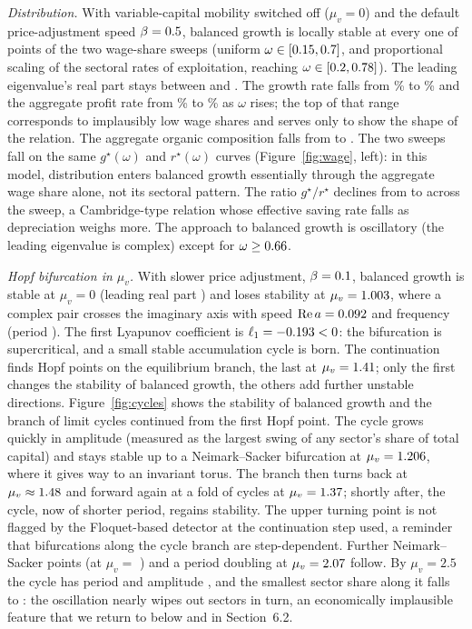 \documentclass[11pt]{article}
\begin{document}
\emph{Distribution.} With variable-capital mobility switched off
($\mu_v=0$) and the default price-adjustment speed $\beta=0.5$,
balanced growth is locally stable at every one of \AccWageNPoints{}
points of the two wage-share sweeps (uniform $\omega\in[0.15,0.7]$, and
proportional scaling of the sectoral rates of exploitation, reaching
$\omega\in[0.2,0.78]$). The leading eigenvalue's real part stays between
\AccWageReMin{} and \AccWageReMax. The growth rate falls from
\AccWageGMax\% to \AccWageGMin\% and the aggregate profit rate from
\AccWageRMax\% to \AccWageRMin\% as $\omega$ rises; the top of that
range corresponds to implausibly low wage shares and serves only to
show the shape of the relation. The aggregate organic composition falls
from \AccWageKMax{} to \AccWageKMin. The two sweeps fall on the same
$g^\star(\omega)$ and $r^\star(\omega)$ curves (Figure~\ref{fig:wage},
left): in this model, distribution enters balanced growth essentially
through the aggregate wage share alone, not its sectoral pattern. The
ratio $g^\star/r^\star$ declines from \AccWageGoverRHi{} to \AccWageGoverRLo{} across the sweep, a
Cambridge-type relation whose effective saving rate falls as depreciation
weighs more. The approach to balanced growth is oscillatory (the leading
eigenvalue is complex) except for $\omega\ge0.66$.

\emph{Hopf bifurcation in $\mu_v$.} With slower price adjustment,
$\beta=0.1$, balanced growth is stable at $\mu_v=0$ (leading real
part \AccRealPartStart) and loses stability at $\mu_v=1.003$, where a
complex pair crosses the imaginary axis with speed
$\operatorname{Re}a=0.092$ and frequency \AccHopfOmega{} (period
\AccHopfPeriod). The first Lyapunov coefficient is $\ell_1=-0.193<0$: the
bifurcation is supercritical, and a small stable accumulation cycle is
born. The continuation finds \AccNHopf{} Hopf points on the
equilibrium branch, the last at $\mu_v=1.41$; only the first
changes the stability of balanced growth, the others add further
unstable directions. Figure~\ref{fig:cycles} shows the stability of
balanced growth and the branch of limit cycles continued from the first
Hopf point. The cycle grows quickly in amplitude (measured as the largest
swing of any sector's share of total capital) and stays stable up to a
Neimark--Sacker bifurcation at $\mu_v=1.206$, where it gives way to
an invariant torus. The branch then turns back at
$\mu_v\approx1.48$ and forward again at a fold of cycles at
$\mu_v=1.37$; shortly after, the cycle, now of shorter period,
regains stability. The upper turning point is not flagged by the
Floquet-based detector at the continuation step used, a reminder that
bifurcations along the cycle branch are step-dependent.
Further Neimark--Sacker points (at $\mu_v=$ \AccNSFurther) and a period
doubling at $\mu_v=2.07$ follow. By $\mu_v=2.5$ the cycle has
period \AccCyclePeriodEnd{} and amplitude \AccCycleAmpEnd, and the smallest
sector share along it falls to \AccCycleQminEnd: the oscillation nearly
wipes out sectors in turn, an economically implausible feature that we
return to below and in Section~6.2.
\end{document}
